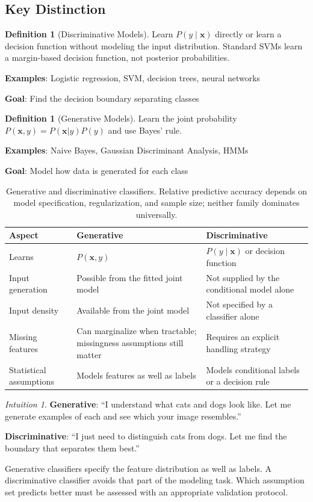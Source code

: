 \documentclass[11pt,twoside]{article}
\numberwithin{equation}{section}
\newcommand{\vect}[1]{\bm{#1}}
\theoremstyle{plain}
\theoremstyle{definition}
\newtheorem{definition}[theorem]{Definition}
\theoremstyle{remark}
\newtheorem{intuition}[theorem]{Intuition}
\begin{document}
\subsection{Key Distinction}

\begin{definition}[Discriminative Models]
Learn $P(y\mid\vect{x})$ directly or learn a decision function without modeling the input distribution. Standard SVMs learn a margin-based decision function, not posterior probabilities.

\textbf{Examples}: Logistic regression, SVM, decision trees, neural networks

\textbf{Goal}: Find the decision boundary separating classes
\end{definition}

\begin{definition}[Generative Models]
Learn the joint probability $P(\vect{x}, y) = P(\vect{x}|y)P(y)$ and use Bayes' rule.

\textbf{Examples}: Naive Bayes, Gaussian Discriminant Analysis, HMMs

\textbf{Goal}: Model how data is generated for each class
\end{definition}

\begin{table}[H]
\centering
\begin{tabular}{@{}p{3cm}p{5.1cm}p{5.1cm}@{}}
\toprule
Aspect & Generative & Discriminative \\
\midrule
Learns & $P(\vect{x},y)$ & $P(y\mid\vect{x})$ or decision function \\
Input generation & Possible from the fitted joint model & Not supplied by the conditional model alone \\
Input density & Available from the joint model & Not specified by a classifier alone \\
Missing features & Can marginalize when tractable; missingness assumptions still matter & Requires an explicit handling strategy \\
Statistical assumptions & Models features as well as labels & Models conditional labels or a decision rule \\
\bottomrule
\end{tabular}
\caption{Generative and discriminative classifiers. Relative predictive accuracy depends on model specification, regularization, and sample size; neither family dominates universally.}
\end{table}

\begin{intuition}
\textbf{Generative}: ``I understand what cats and dogs look like. Let me generate examples of each and see which your image resembles.''

\textbf{Discriminative}: ``I just need to distinguish cats from dogs. Let me find the boundary that separates them best.''

Generative classifiers specify the feature distribution as well as labels. A discriminative classifier avoids that part of the modeling task. Which assumption set predicts better must be assessed with an appropriate validation protocol.
\end{intuition}
\end{document}
